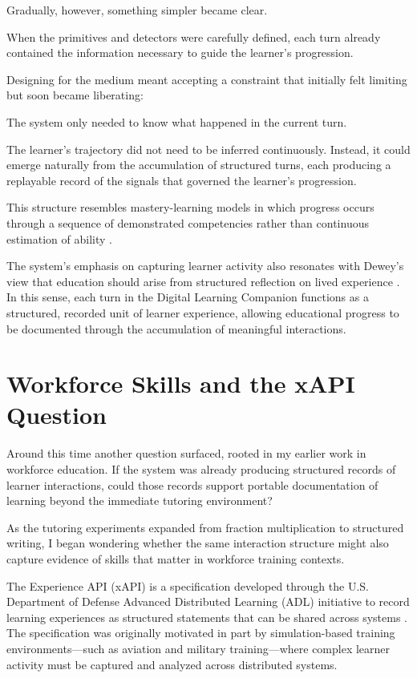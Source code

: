 \documentclass[11pt]{article}
\begin{document}
Gradually, however, something simpler became clear.

When the primitives and detectors were carefully defined, each turn already contained the information necessary to guide the learner’s progression.

Designing for the medium meant accepting a constraint that initially felt limiting but soon
became liberating:

The system only needed to know what happened in the current turn.

The learner’s trajectory did not need to be inferred continuously. Instead, it could emerge
naturally from the accumulation of structured turns, each producing a replayable record of the
signals that governed the learner’s progression.

This structure resembles mastery-learning models in which progress occurs through a sequence
of demonstrated competencies rather than continuous estimation of ability \citep{bloom1968,bloom1984}.

The system’s emphasis on capturing learner activity also resonates with Dewey’s view that education should arise from structured reflection on lived experience \citep{dewey1938}. In this sense, each turn in the Digital Learning Companion functions as a structured, recorded unit of learner experience, allowing educational progress to be documented through the accumulation of meaningful interactions.


\section{Workforce Skills and the xAPI Question}

Around this time another question surfaced, rooted in my earlier work in workforce education. If the system was already producing structured records of learner interactions, could those records support portable documentation of learning beyond the immediate tutoring environment?

As the tutoring experiments expanded from fraction multiplication to structured writing, I began wondering whether the same interaction structure might also capture evidence of skills that matter in workforce training contexts.

The Experience API (xAPI) is a specification developed through the U.S. Department of Defense Advanced Distributed Learning (ADL) initiative to record learning experiences as structured statements that can be shared across systems \citep{adl2013}. The specification was originally motivated in part by simulation-based training environments—such as aviation and military training—where complex learner activity must be captured and analyzed across distributed systems.
\end{document}
